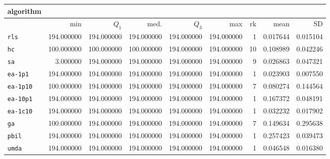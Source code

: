 \begin{center}
\begin{tabular}{@{}l*{5}{>{{}}N{3}{0}}>{{}}N{2}{0}N{1}{3}N{1}{3}@{}}
\toprule
{algorithm} &  &  \\
\midrule
& {min} & {$Q_1$} & {med.} & {$Q_3$} & {max} & {rk} & {mean} & {SD} \\
\midrule
\verb|rls| & {\color{blue}} 194.000000 & {\color{blue}} 194.000000 & {\color{blue}} 194.000000 & {\color{blue}} 194.000000 & {\color{blue}} 194.000000 & 1 & 0.017644 & 0.015104 \\
 \verb|hc| & 100.000000 & 100.000000 & 100.000000 & {\color{blue}} 194.000000 & {\color{blue}} 194.000000 & 10 & 0.108989 & 0.042246 \\
 \verb|sa| & 3.000000 & {\color{blue}} 194.000000 & {\color{blue}} 194.000000 & {\color{blue}} 194.000000 & {\color{blue}} 194.000000 & 9 & 0.026863 & 0.047321 \\
 \verb|ea-1p1| & {\color{blue}} 194.000000 & {\color{blue}} 194.000000 & {\color{blue}} 194.000000 & {\color{blue}} 194.000000 & {\color{blue}} 194.000000 & 1 & 0.023903 & 0.007550 \\
 \verb|ea-1p10| & 100.000000 & {\color{blue}} 194.000000 & {\color{blue}} 194.000000 & {\color{blue}} 194.000000 & {\color{blue}} 194.000000 & 7 & 0.080274 & 0.144564 \\
 \verb|ea-10p1| & {\color{blue}} 194.000000 & {\color{blue}} 194.000000 & {\color{blue}} 194.000000 & {\color{blue}} 194.000000 & {\color{blue}} 194.000000 & 1 & 0.167372 & 0.048191 \\
 \verb|ea-1c10| & {\color{blue}} 194.000000 & {\color{blue}} 194.000000 & {\color{blue}} 194.000000 & {\color{blue}} 194.000000 & {\color{blue}} 194.000000 & 1 & 0.032232 & 0.017902 \\
 \verb|ga| & 100.000000 & {\color{blue}} 194.000000 & {\color{blue}} 194.000000 & {\color{blue}} 194.000000 & {\color{blue}} 194.000000 & 7 & 0.149634 & 0.295638 \\
 \verb|pbil| & {\color{blue}} 194.000000 & {\color{blue}} 194.000000 & {\color{blue}} 194.000000 & {\color{blue}} 194.000000 & {\color{blue}} 194.000000 & 1 & 0.257423 & 0.039473 \\
 \verb|umda| & {\color{blue}} 194.000000 & {\color{blue}} 194.000000 & {\color{blue}} 194.000000 & {\color{blue}} 194.000000 & {\color{blue}} 194.000000 & 1 & 0.046548 & 0.016380 \\
 \bottomrule
\end{tabular}
\end{center}

